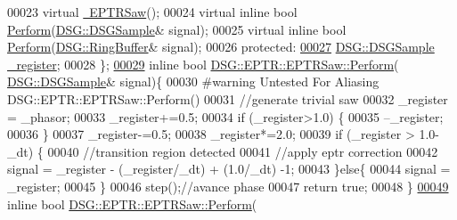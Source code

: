 \begin{DoxyCode}
00023             \textcolor{keyword}{virtual} \hyperlink{class_d_s_g_1_1_e_p_t_r_1_1_e_p_t_r_saw_a932fb8ef2df61ed06e6cca5cdc622884}{~EPTRSaw}();
00024             \textcolor{keyword}{virtual} \textcolor{keyword}{inline} \textcolor{keywordtype}{bool} \hyperlink{class_d_s_g_1_1_e_p_t_r_1_1_e_p_t_r_saw_aa253efa41cca56f334ccb0fd32c2cd56}{Perform}(\hyperlink{namespace_d_s_g_ac39a94cd27ebcd9c1e7502d0c624894a}{DSG::DSGSample}& signal);
00025             \textcolor{keyword}{virtual} \textcolor{keyword}{inline} \textcolor{keywordtype}{bool} \hyperlink{class_d_s_g_1_1_e_p_t_r_1_1_e_p_t_r_saw_aa253efa41cca56f334ccb0fd32c2cd56}{Perform}(\hyperlink{class_d_s_g_1_1_ring_buffer}{DSG::RingBuffer}& signal);
00026         \textcolor{keyword}{protected}:
\hypertarget{_e_p_t_r_saw_8h_source_l00027}{}\hyperlink{class_d_s_g_1_1_e_p_t_r_1_1_e_p_t_r_saw_a38d89a4557f487e0e447e1da6acf7e5f}{00027}             \hyperlink{namespace_d_s_g_ac39a94cd27ebcd9c1e7502d0c624894a}{DSG::DSGSample} \hyperlink{class_d_s_g_1_1_e_p_t_r_1_1_e_p_t_r_saw_a38d89a4557f487e0e447e1da6acf7e5f}{\_register};
00028         \};
\hypertarget{_e_p_t_r_saw_8h_source_l00029}{}\hyperlink{class_d_s_g_1_1_e_p_t_r_1_1_e_p_t_r_saw_aa253efa41cca56f334ccb0fd32c2cd56}{00029}         \textcolor{keyword}{inline} \textcolor{keywordtype}{bool} \hyperlink{class_d_s_g_1_1_e_p_t_r_1_1_e_p_t_r_saw_aa253efa41cca56f334ccb0fd32c2cd56}{DSG::EPTR::EPTRSaw::Perform}(
      \hyperlink{namespace_d_s_g_ac39a94cd27ebcd9c1e7502d0c624894a}{DSG::DSGSample}& signal)\{
00030 \textcolor{preprocessor}{#warning Untested For Aliasing DSG::EPTR::EPTRSaw::Perform()}
00031             \textcolor{comment}{//generate trivial saw}
00032             \_register = \_phasor;
00033             \_register+=0.5;
00034             \textcolor{keywordflow}{if} (\_register>1.0) \{
00035                 --\_register;
00036             \}
00037             \_register-=0.5;
00038             \_register*=2.0;
00039             \textcolor{keywordflow}{if} (\_register > 1.0-\_dt) \{
00040                 \textcolor{comment}{//transition region detected}
00041                 \textcolor{comment}{//apply eptr correction}
00042                 signal = \_register - (\_register/\_dt) + (1.0/\_dt) -1;
00043             \}\textcolor{keywordflow}{else}\{
00044                 signal = \_register;
00045             \}
00046             step();\textcolor{comment}{//avance phase}
00047             \textcolor{keywordflow}{return} \textcolor{keyword}{true};
00048         \}
\hypertarget{_e_p_t_r_saw_8h_source_l00049}{}\hyperlink{class_d_s_g_1_1_e_p_t_r_1_1_e_p_t_r_saw_a9dbefaeeb74e30e722bb5d8ea767cdca}{00049}         \textcolor{keyword}{inline} \textcolor{keywordtype}{bool} \hyperlink{class_d_s_g_1_1_e_p_t_r_1_1_e_p_t_r_saw_aa253efa41cca56f334ccb0fd32c2cd56}{DSG::EPTR::EPTRSaw::Perform}(

\end{DoxyCode}

